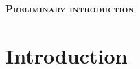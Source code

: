 \documentclass[usletter, 12pt]{article}
\begin{document}
	\begin{center}
		\Large \textsc{\textbf{Preliminary introduction}}\\
	\end{center}
	
	
	\newpage
	
	\section{Introduction}
			 	 		
		
		
			
	\newpage
	

	
	
	
	
	
	
	
		
\end{document}
